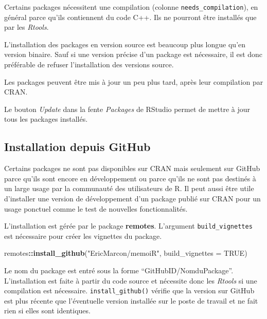 \documentclass[
  12pt,
  french,
  a4paper,
  extrafontsizes,onecolumn,openright
  ]{memoir}
\newenvironment{Shaded}{\begin{snugshade}}{\end{snugshade}}
\newcommand{\DataTypeTok}[1]{\textcolor[rgb]{0.13,0.29,0.53}{#1}}
\newcommand{\KeywordTok}[1]{\textcolor[rgb]{0.13,0.29,0.53}{\textbf{#1}}}
\newcommand{\NormalTok}[1]{#1}
\newcommand{\OperatorTok}[1]{\textcolor[rgb]{0.81,0.36,0.00}{\textbf{#1}}}
\newcommand{\OtherTok}[1]{\textcolor[rgb]{0.56,0.35,0.01}{#1}}
\newcommand{\StringTok}[1]{\textcolor[rgb]{0.31,0.60,0.02}{#1}}
\begin{document}
Certains packages nécessitent une compilation (colonne \texttt{needs\_compilation}), en général parce qu'ils contiennent du code C++.
Ils ne pourront être installés que par les \emph{Rtools}.

L'installation des packages en version source est beaucoup plus longue qu'en version binaire.
Sauf si une version précise d'un package est nécessaire, il est donc préférable de refuser l'installation des versions source.

Les packages peuvent être mis à jour un peu plus tard, après leur compilation par CRAN.

Le bouton \emph{Update} dans la fente \emph{Packages} de RStudio permet de mettre à jour tous les packages installés.

\hypertarget{installation-depuis-github}{%
\subsection{Installation depuis GitHub}\label{installation-depuis-github}}

Certains packages ne sont pas disponibles sur CRAN mais seulement sur GitHub parce qu'ils sont encore en développement ou parce qu'ils ne sont pas destinés à un large usage par la communauté des utilisateurs de R.
Il peut aussi être utile d'installer une version de développement d'un package publié sur CRAN pour un usage ponctuel comme le test de nouvelles fonctionnalités.

L'installation est gérée par le package \textbf{remotes}.
L'argument \texttt{build\_vignettes} est nécessaire pour créer les vignettes du package.

\scriptsize

\begin{Shaded}
\begin{Highlighting}[]
\NormalTok{remotes}\OperatorTok{::}\KeywordTok{install_github}\NormalTok{(}\StringTok{"EricMarcon/memoiR"}\NormalTok{, }\DataTypeTok{build_vignettes =} \OtherTok{TRUE}\NormalTok{)}
\end{Highlighting}
\end{Shaded}

\normalsize

Le nom du package est entré sous la forme \enquote{GitHubID/\break NomduPackage}.
L'installation est faite à partir du code source et nécessite donc les \emph{Rtools} si une compilation est nécessaire.
\texttt{install\_github()} vérifie que la version sur GitHub est plus récente que l'éventuelle version installée sur le poste de travail et ne fait rien si elles sont identiques.
\end{document}
